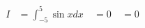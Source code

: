 \documentclass[preview]{standalone}
\begin{document}
\begin{align*}
I &= \int_{-5}^{5} \sin x dx \ &= 0 \ &= 0
\end{align*}
\end{document}
